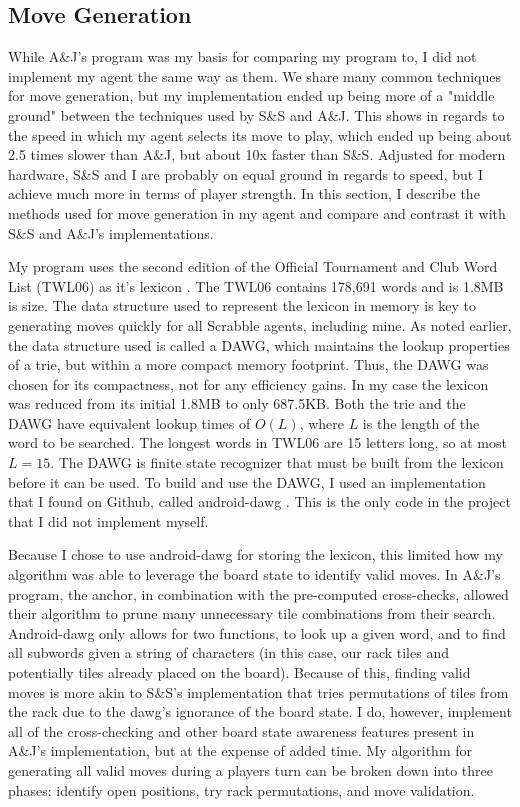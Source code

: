 \documentclass[letterpaper]{article}
\begin{document}
\subsection{Move Generation}
While A\&J's program was my basis for comparing my program to, I did not implement my agent the same way as them. We share many common techniques for move generation, but my implementation ended up being more of a "middle ground" between the techniques used by S\&S and A\&J. This shows in regards to the speed in which my agent selects its move to play, which ended up being about 2.5 times slower than A\&J, but about 10x faster than S\&S. Adjusted for modern hardware, S\&S and I are probably on equal ground in regards to speed, but I achieve much more in terms of player strength. In this section, I describe the methods used for move generation in my agent and compare and contrast it with S\&S and A\&J's implementations.

My program uses the second edition of the Official Tournament and Club Word List (TWL06) as it's lexicon \cite{naspa}. The TWL06 contains 178,691 words and is 1.8MB is size. The data structure used to represent the lexicon in memory is key to generating moves quickly for all Scrabble agents, including mine. As noted earlier, the data structure used is called a DAWG, which maintains the lookup properties of a trie, but within a more compact memory footprint. Thus, the DAWG was chosen for its compactness, not for any efficiency gains. In my case the lexicon was reduced from its initial 1.8MB to only 687.5KB. Both the trie and the DAWG have equivalent lookup times of $O(L)$, where $L$ is the length of the word to be searched. The longest words in TWL06 are 15 letters long, so at most $L=15$. The DAWG is finite state recognizer that must be built from the lexicon before it can be used. To build and use the DAWG, I used an implementation that I found on Github, called android-dawg \cite{icantrap}. This is the only code in the project that I did not implement myself.

Because I chose to use android-dawg for storing the lexicon, this limited how my algorithm was able to leverage the board state to identify valid moves. In A\&J's program, the anchor, in combination with the pre-computed cross-checks, allowed their algorithm to prune many unnecessary tile combinations from their search. Android-dawg only allows for two functions, to look up a given word, and to find all subwords given a string of characters (in this case, our rack tiles and potentially tiles already placed on the board). Because of this, finding valid moves is more akin to S\&S's implementation that tries permutations of tiles from the rack due to the dawg's ignorance of the board state. I do, however, implement all of the cross-checking and other board state awareness features present in A\&J's implementation, but at the expense of added time. My algorithm for generating all valid moves during a players turn can be broken down into three phases: identify open positions, try rack permutations, and move validation.
\end{document}
